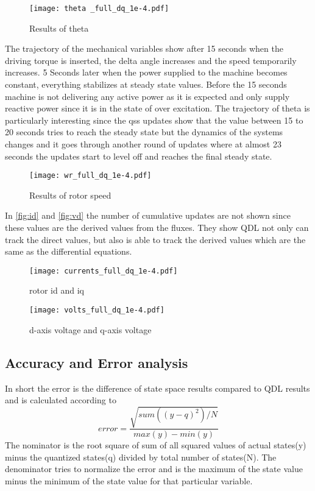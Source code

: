 \documentclass{article}
\theoremstyle{scsthe}
\begin{document}
 \begin{figure}[H]
 \FloatBarrier
    \centering
    \texttt{[image: theta \_full\_dq\_1e-4.pdf]}
    \caption{Results of theta}
    \label{fig:tehta}
\end{figure}
The trajectory of the mechanical variables show after 15 seconds when the driving torque is inserted, the delta angle increases and the speed temporarily increases. 5 Seconds later when the power supplied to the machine becomes constant, everything stabilizes at steady state values. 
Before the 15 seconds machine is not delivering any active power as it is expected and only supply reactive power since it is in the state of over excitation.
The trajectory of theta is particularly interesting since the qss updates show that the value between 15 to 20 seconds tries to reach the steady state but the dynamics of the systems changes and it goes through another round of updates where at almost 23 seconds the updates start to level off and reaches the final steady state. 

 \begin{figure}[H]
 \FloatBarrier
    \centering
    \texttt{[image: wr\_full\_dq\_1e-4.pdf]}
    \caption{Results of rotor speed}
    \label{fig:wr}
\end{figure}

In \autoref{fig:id} and \autoref{fig:vd} the number of cumulative updates are not shown since these values are the derived values from the fluxes. They show QDL not only can track the direct values, but also is able to track the derived values which are the same as the differential equations.  

 \begin{figure}[H]
 \FloatBarrier
    \centering
    \texttt{[image: currents\_full\_dq\_1e-4.pdf]}
    \caption{rotor id and iq}
    \label{fig:id}
\end{figure}

 \begin{figure}[H]
 \FloatBarrier
    \centering
    \texttt{[image: volts\_full\_dq\_1e-4.pdf]}
    \caption{d-axis voltage and q-axis voltage}
    \label{fig:vd}
\end{figure}



\subsection{Accuracy and Error analysis}
In short the error is the difference of state space results compared to QDL results and is calculated according to 
\begin{equation} \label{eq:Normalized Relative RootMean Square Error}
error= \frac{\sqrt{sum((y-q)^2)/N}} {max(y)-min(y)}
\end{equation}
The nominator is the root square of sum of all squared values of actual states(y) minus the quantized states(q) divided by total number of states(N). The denominator tries to normalize the error and is the maximum of the state value minus the minimum of the state value for that particular variable.
\end{document}

